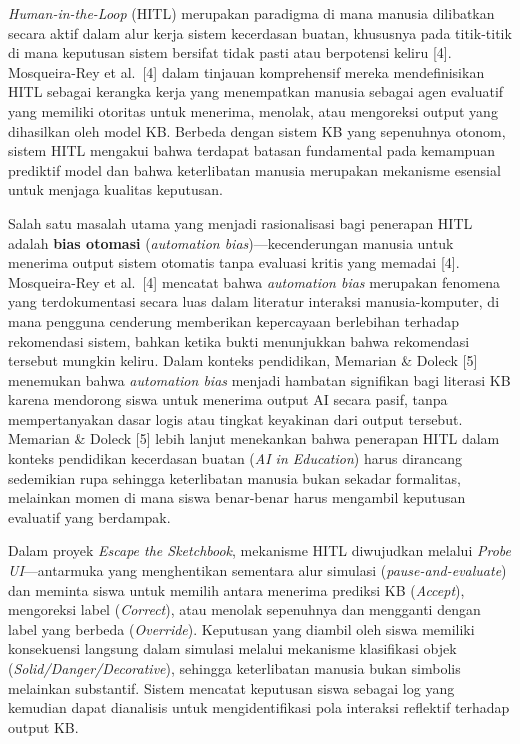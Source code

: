 \documentclass[12pt,oneside]{report}
\begin{document}
\textit{Human-in-the-Loop} (HITL) merupakan paradigma di mana manusia dilibatkan secara aktif dalam alur kerja sistem kecerdasan buatan, khususnya pada titik-titik di mana keputusan sistem bersifat tidak pasti atau berpotensi keliru [4]. Mosqueira-Rey et al.\ [4] dalam tinjauan komprehensif mereka mendefinisikan HITL sebagai kerangka kerja yang menempatkan manusia sebagai agen evaluatif yang memiliki otoritas untuk menerima, menolak, atau mengoreksi output yang dihasilkan oleh model KB. Berbeda dengan sistem KB yang sepenuhnya otonom, sistem HITL mengakui bahwa terdapat batasan fundamental pada kemampuan prediktif model dan bahwa keterlibatan manusia merupakan mekanisme esensial untuk menjaga kualitas keputusan.

Salah satu masalah utama yang menjadi rasionalisasi bagi penerapan HITL adalah \textbf{bias otomasi} (\textit{automation bias})---kecenderungan manusia untuk menerima output sistem otomatis tanpa evaluasi kritis yang memadai [4]. Mosqueira-Rey et al.\ [4] mencatat bahwa \textit{automation bias} merupakan fenomena yang terdokumentasi secara luas dalam literatur interaksi manusia-komputer, di mana pengguna cenderung memberikan kepercayaan berlebihan terhadap rekomendasi sistem, bahkan ketika bukti menunjukkan bahwa rekomendasi tersebut mungkin keliru. Dalam konteks pendidikan, Memarian \& Doleck [5] menemukan bahwa \textit{automation bias} menjadi hambatan signifikan bagi literasi KB karena mendorong siswa untuk menerima output AI secara pasif, tanpa mempertanyakan dasar logis atau tingkat keyakinan dari output tersebut. Memarian \& Doleck [5] lebih lanjut menekankan bahwa penerapan HITL dalam konteks pendidikan kecerdasan buatan (\textit{AI in Education}) harus dirancang sedemikian rupa sehingga keterlibatan manusia bukan sekadar formalitas, melainkan momen di mana siswa benar-benar harus mengambil keputusan evaluatif yang berdampak.

Dalam proyek \textit{Escape the Sketchbook}, mekanisme HITL diwujudkan melalui \textit{Probe UI}---antarmuka yang menghentikan sementara alur simulasi (\textit{pause-and-evaluate}) dan meminta siswa untuk memilih antara menerima prediksi KB (\textit{Accept}), mengoreksi label (\textit{Correct}), atau menolak sepenuhnya dan mengganti dengan label yang berbeda (\textit{Override}). Keputusan yang diambil oleh siswa memiliki konsekuensi langsung dalam simulasi melalui mekanisme klasifikasi objek (\textit{Solid/Danger/Decorative}), sehingga keterlibatan manusia bukan simbolis melainkan substantif. Sistem mencatat keputusan siswa sebagai log yang kemudian dapat dianalisis untuk mengidentifikasi pola interaksi reflektif terhadap output KB.
\end{document}
